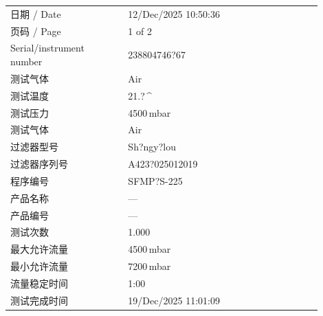 \documentclass[UTF8,10pt,a4paper,fontset=fandol]{ctexart}
\newcommand{\fieldvalue}[1]{#1}
\begin{document}
\begin{tabular}{@{}p{0.34\linewidth}p{0.56\linewidth}@{}}
日期 / Date &
\fieldvalue{12/Dec/2025 10:50:36}
\\[2pt]
页码 / Page &
\fieldvalue{1 of 2}
\\[2pt]
Serial/instrument number &
\fieldvalue{238804746?67}
\\[2pt]
测试气体 &
\fieldvalue{Air}
\\[2pt]
测试温度 &
\fieldvalue{21.?\,^\circ\mathrm{C}}
\\[2pt]
测试压力 &
\fieldvalue{4500\,mbar}
\\[2pt]
测试气体 &
\fieldvalue{Air}
\\[2pt]
过滤器型号 &
\fieldvalue{Sh?ngy?lou}
\\[2pt]
过滤器序列号 &
\fieldvalue{A423?025012019}
\\[2pt]
程序编号 &
\fieldvalue{SFMP?S-225}
\\[2pt]
产品名称 &
\fieldvalue{---}
\\[2pt]
产品编号 &
\fieldvalue{---}
\\[2pt]
测试次数 &
\fieldvalue{1.000}
\\[2pt]
最大允许流量 &
\fieldvalue{4500\,mbar}
\\[2pt]
最小允许流量 &
\fieldvalue{7200\,mbar}
\\[2pt]
流量稳定时间 &
\fieldvalue{1:00}
\\[2pt]
测试完成时间 &
\fieldvalue{19/Dec/2025 11:01:09}
\end{tabular}

\vspace{1em}
\end{document}
